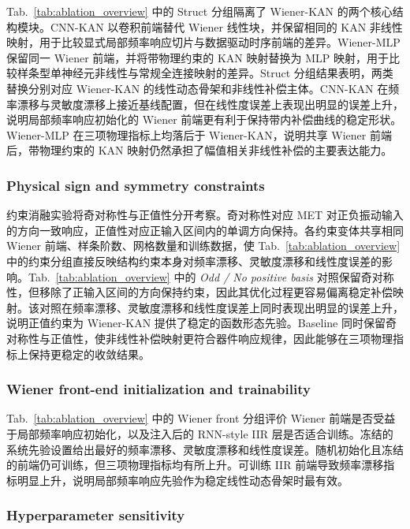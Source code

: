 \documentclass[sn-nature]{sn-jnl}
\newif\ifCNENEnglish
\newif\ifCNENBilingual
\newcommand{\CNEN}[2]{%
    \ifCNENBilingual
        #1%
        \if\relax\detokenize{#2}\relax\else\par #2\fi%
    \else
        \ifCNENEnglish
            #2%
        \else
            #1%
        \fi
    \fi
}
\begin{document}
\CNEN{Tab.~\ref{tab:ablation_overview} 中的 Struct 分组隔离了 Wiener-KAN 的两个核心结构模块。CNN-KAN 以卷积前端替代 Wiener 线性块，并保留相同的 KAN 非线性映射，用于比较显式局部频率响应切片与数据驱动时序前端的差异。Wiener-MLP 保留同一 Wiener 前端，并将带物理约束的 KAN 映射替换为 MLP 映射，用于比较样条型单神经元非线性与常规全连接映射的差异。Struct 分组结果表明，两类替换分别对应 Wiener-KAN 的线性动态骨架和非线性补偿主体。CNN-KAN 在频率漂移与灵敏度漂移上接近基线配置，但在线性度误差上表现出明显的误差上升，说明局部频率响应初始化的 Wiener 前端更有利于保持带内补偿曲线的稳定形状。Wiener-MLP 在三项物理指标上均落后于 Wiener-KAN，说明共享 Wiener 前端后，带物理约束的 KAN 映射仍然承担了幅值相关非线性补偿的主要表达能力。}{}

\subsubsection{Physical sign and symmetry constraints}

\CNEN{约束消融实验将奇对称性与正值性分开考察。奇对称性对应 MET 对正负振动输入的方向一致响应，正值性对应正输入区间内的单调方向保持。各约束变体共享相同 Wiener 前端、样条阶数、网格数量和训练数据，使 Tab.~\ref{tab:ablation_overview} 中的约束分组直接反映结构约束本身对频率漂移、灵敏度漂移和线性度误差的影响。Tab.~\ref{tab:ablation_overview} 中的 \textit{Odd / No positive basis} 对照保留奇对称性，但移除了正输入区间的方向保持约束，因此其优化过程更容易偏离稳定补偿映射。该对照在频率漂移、灵敏度漂移和线性度误差上同时表现出明显的误差上升，说明正值约束为 Wiener-KAN 提供了稳定的函数形态先验。Baseline 同时保留奇对称性与正值性，使非线性补偿映射更符合器件响应规律，因此能够在三项物理指标上保持更稳定的收敛结果。}{}

\subsubsection{Wiener front-end initialization and trainability}

\CNEN{Tab.~\ref{tab:ablation_overview} 中的 Wiener front 分组评价 Wiener 前端是否受益于局部频率响应初始化，以及注入后的 RNN-style IIR 层是否适合训练。冻结的系统先验设置给出最好的频率漂移、灵敏度漂移和线性度误差。随机初始化且冻结的前端仍可训练，但三项物理指标均有所上升。可训练 IIR 前端导致频率漂移指标明显上升，说明局部频率响应先验作为稳定线性动态骨架时最有效。}{}

\subsubsection{Hyperparameter sensitivity}
\end{document}
